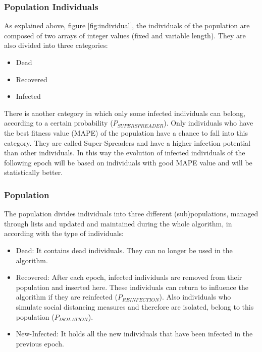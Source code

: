 \documentclass[letterpaper]{article}%
\begin{document}
\subsubsection{Population Individuals}
	As explained above, figure \ref{fig:individual}, the individuals of the population are composed of two arrays of integer values (fixed and variable length). They are also divided into three categories:
\begin{itemize}
\item Dead
\item Recovered
\item Infected
\end{itemize}
There is another category in which only some infected individuals can belong, according to a certain probability ($P_{SUPERSPREADER}$). Only individuals who have the best fitness value (MAPE) of the population have a chance to fall into this category. They are called Super-Spreaders and have a higher infection potential than other individuals. In this way the evolution of infected individuals of the following epoch will be based on individuals with good MAPE value and will be statistically better.

\subsubsection{Population}
	The population divides individuals into three different (sub)populations, managed through lists and updated and maintained during the whole algorithm, in according with the type of individuals:
\begin{itemize}
\item Dead: It contains dead individuals. They can no longer be used in the algorithm.
\item Recovered: After each epoch, infected individuals are removed from their population and inserted here. These individuals can return to influence the algorithm if they are reinfected ($P_{REINFECTION}$). Also individuals who simulate social distancing measures and therefore are isolated, belong to this population ($P_{ISOLATION}$).
\item New-Infected: It holds all the new individuals that have been infected in the previous epoch.
\end{itemize}
\end{document}
